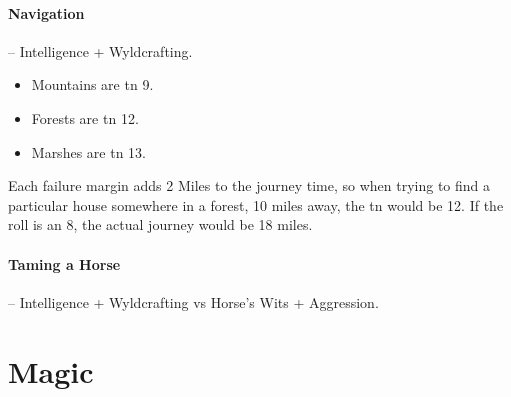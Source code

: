\begin{multicols}{2}
\paragraph{Navigation} -- Intelligence + Wyldcrafting.
\label{marching}
\begin{itemize}

  \item
    Mountains are \gls{tn} 9.
  \item
    Forests are \gls{tn} 12.
  \item
    Marshes are \gls{tn} 13.

\end{itemize}

Each failure margin adds 2 Miles to the journey time, so when trying to find a particular house somewhere in a forest, 10 miles away, the \gls{tn} would be 12.
If the roll is an 8, the actual journey would be 18 miles.

\paragraph{Taming a Horse} -- Intelligence + Wyldcrafting vs Horse's Wits + Aggression.

\end{multicols}

\section{Magic}

